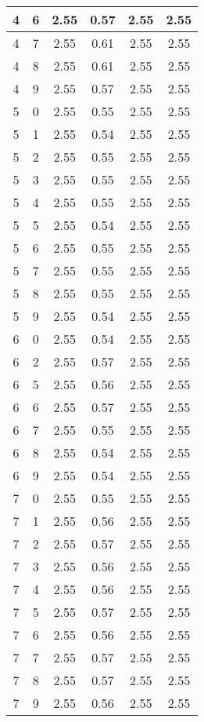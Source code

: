 \begin{longtable}{|c|c||c||c||c|c|}
	4 & 6 & 2.55 & 0.57 & 2.55 & 2.55 \\ \hline
	4 & 7 & 2.55 & 0.61 & 2.55 & 2.55 \\ \hline
	4 & 8 & 2.55 & 0.61 & 2.55 & 2.55 \\ \hline
	4 & 9 & 2.55 & 0.57 & 2.55 & 2.55 \\ \hline
	5 & 0 & 2.55 & 0.55 & 2.55 & 2.55 \\ \hline
	5 & 1 & 2.55 & 0.54 & 2.55 & 2.55 \\ \hline
	5 & 2 & 2.55 & 0.55 & 2.55 & 2.55 \\ \hline
	5 & 3 & 2.55 & 0.55 & 2.55 & 2.55 \\ \hline
	5 & 4 & 2.55 & 0.55 & 2.55 & 2.55 \\ \hline
	5 & 5 & 2.55 & 0.54 & 2.55 & 2.55 \\ \hline
	5 & 6 & 2.55 & 0.55 & 2.55 & 2.55 \\ \hline
	5 & 7 & 2.55 & 0.55 & 2.55 & 2.55 \\ \hline
	5 & 8 & 2.55 & 0.55 & 2.55 & 2.55 \\ \hline
	5 & 9 & 2.55 & 0.54 & 2.55 & 2.55 \\ \hline
	6 & 0 & 2.55 & 0.54 & 2.55 & 2.55 \\ \hline
	6 & 2 & 2.55 & 0.57 & 2.55 & 2.55 \\ \hline
	6 & 5 & 2.55 & 0.56 & 2.55 & 2.55 \\ \hline
	6 & 6 & 2.55 & 0.57 & 2.55 & 2.55 \\ \hline
	6 & 7 & 2.55 & 0.55 & 2.55 & 2.55 \\ \hline
	6 & 8 & 2.55 & 0.54 & 2.55 & 2.55 \\ \hline
	6 & 9 & 2.55 & 0.54 & 2.55 & 2.55 \\ \hline
	7 & 0 & 2.55 & 0.55 & 2.55 & 2.55 \\ \hline
	7 & 1 & 2.55 & 0.56 & 2.55 & 2.55 \\ \hline
	7 & 2 & 2.55 & 0.57 & 2.55 & 2.55 \\ \hline
	7 & 3 & 2.55 & 0.56 & 2.55 & 2.55 \\ \hline
	7 & 4 & 2.55 & 0.56 & 2.55 & 2.55 \\ \hline
	7 & 5 & 2.55 & 0.57 & 2.55 & 2.55 \\ \hline
	7 & 6 & 2.55 & 0.56 & 2.55 & 2.55 \\ \hline
	7 & 7 & 2.55 & 0.57 & 2.55 & 2.55 \\ \hline
	7 & 8 & 2.55 & 0.57 & 2.55 & 2.55 \\ \hline
	7 & 9 & 2.55 & 0.56 & 2.55 & 2.55 \\ \hline
\end{longtable}
